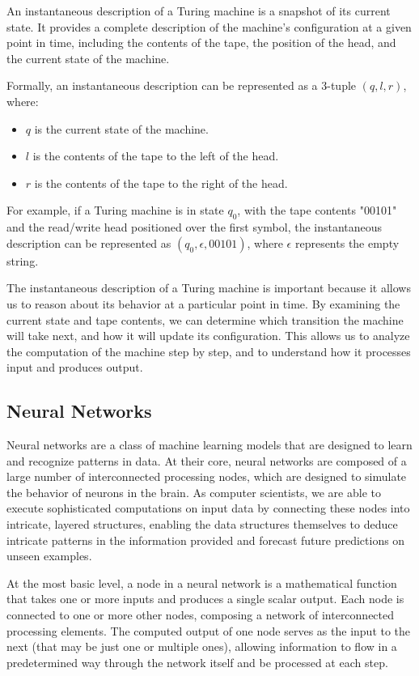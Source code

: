 \documentclass{article}
\begin{document}
An instantaneous description of a Turing machine is a snapshot of its current state. It provides a complete description of the machine's configuration at a given point in time, including the contents of the tape, the position of the head, and the current state of the machine.

Formally, an instantaneous description can be represented as a 3-tuple $(q, l, r)$, where:

\begin{itemize}
    \item $q$ is the current state of the machine.
    \item $l$ is the contents of the tape to the left of the head.
    \item $r$ is the contents of the tape to the right of the head.
\end{itemize}

For example, if a Turing machine is in state $q_0$, with the tape contents "00101" and the read/write head positioned over the first symbol, the instantaneous description can be represented as $(q_0, \epsilon, 00101)$, where $\epsilon$ represents the empty string.

The instantaneous description of a Turing machine is important because it allows us to reason about its behavior at a particular point in time. By examining the current state and tape contents, we can determine which transition the machine will take next, and how it will update its configuration. This allows us to analyze the computation of the machine step by step, and to understand how it processes input and produces output.

\subsection{Neural Networks}

Neural networks are a class of machine learning models that are designed to learn and recognize patterns in data. At their core, neural networks are composed of a large number of interconnected processing nodes, which are designed to simulate the behavior of neurons in the brain. As computer scientists, we are able to execute sophisticated computations on input data by connecting these nodes into intricate, layered structures, enabling the data structures themselves to deduce intricate patterns in the information provided and forecast future predictions on unseen examples.

At the most basic level, a node in a neural network is a mathematical function that takes one or more inputs and produces a single scalar output. Each node is connected to one or more other nodes, composing a network of interconnected processing elements. The computed output of one node serves as the input to the next (that may be just one or multiple ones), allowing information to flow in a predetermined way through the network itself and be processed at each step.
\end{document}
